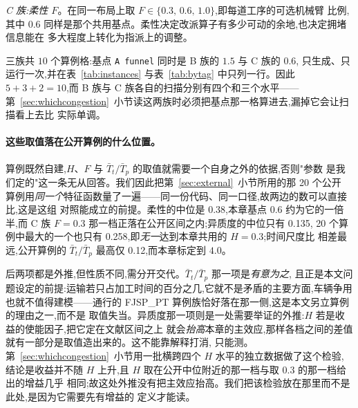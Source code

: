 \documentclass[manuscript,screen,review]{acmart}
\newcommand{\NCases}{10}
\newcommand{\PubFMed}{0.38}              %
\newcommand{\PubHMed}{0.135}             %
\newcommand{\PubHMax}{0.258}             %
\newcommand{\PubTtTpHi}{0.12}            %
\newcommand{\PubNInst}{20}
\begin{document}
\emph{C 族:柔性 $F$}。在同一布局上取 $F\in\{0.3,\,0.6,\,1.0\}$,即每道工序的可选机械臂
比例,其中 $0.6$ 同样是那个共用基点。柔性决定改派算子有多少可动的余地,也决定拥堵信息能在
多大程度上转化为指派上的调整。

三族共 $\NCases$ 个算例格:基点 \texttt{A funnel} 同时是 B 族的 $1.5$ 与 C 族的 $0.6$,
只生成、只运行一次,并在表~\ref{tab:instances} 与表~\ref{tab:bytag} 中只列一行。因此
$5+3+2=\NCases$,而 B 族与 C 族各自的扫描分别有四个和三个水平——
第~\ref{sec:whichcongestion}~小节读这两族时必须把基点那一格算进去,漏掉它会让扫描看上去比
实际单调。

\paragraph{这些取值落在公开算例的什么位置。}
算例既然自建,$H$、$F$ 与 $\bar{T}_t/\bar{T}_p$ 的取值就需要一个自身之外的依据,否则"参数
是我们定的"这一条无从回答。我们因此把第~\ref{sec:external}~小节所用的那 \PubNInst{} 个公开
算例用\emph{同一个}特征函数量了一遍——同一份代码、同一口径,故两边的数可以直接比,这是这组
对照能成立的前提。柔性的中位是 \PubFMed{},本章基点
$0.6$ 约为它的一倍半,而 C 族 $F=0.3$ 那一档正落在公开区间之内;异质度的中位只有 \PubHMed{},
\PubNInst{} 个算例中最大的一个也只有 \PubHMax{},即\emph{无一}达到本章共用的 $H=0.3$;时间尺度比
相差最远,公开算例的 $\bar{T}_t/\bar{T}_p$ 最高仅 \PubTtTpHi{},而本章标定到 $4.0$。

后两项都是外推,但性质不同,需分开交代。$\bar{T}_t/\bar{T}_p$ 那一项是\emph{有意为之},
且正是本文问题设定的前提:运输若只占加工时间的百分之几,它就不是矛盾的主要方面,车辆争用
也就不值得建模——通行的 FJSP\_PT 算例族恰好落在那一侧,这是本文另立算例的理由之一,而不是
取值失当。异质度那一项则是一处需要举证的外推:$H$ 若是收益的使能因子,把它定在文献区间之上
就会\emph{抬高}本章的主效应,那样各档之间的差值就有一部分是取值造出来的。这不能靠解释打消,
只能测。第~\ref{sec:whichcongestion}~小节用一批横跨四个 $H$ 水平的独立数据做了这个检验,
结论是收益并不随 $H$ 上升,且 $H$ 取在公开中位附近的那一档与取 $0.3$ 的那一档给出的增益几乎
相同;故这处外推没有把主效应抬高。我们把该检验放在那里而不是此处,是因为它需要先有增益的
定义才能读。

\begin{table}[t]
\caption{受控算例族。全部算例格共用 $12$ 工件、$36$ 道真实工序、$8$ 台机械臂、$H=0.3$、
$\bar{T}_t/\bar{T}_p\approx4.0$;三族分别只变化布局、车臂比与柔性。争用强度为初始随机种群
下让行时间占行驶总时间的比例,由算例自身结构决定而非人为设定。}
\label{tab:instances}
\small

\end{table}
\end{document}
